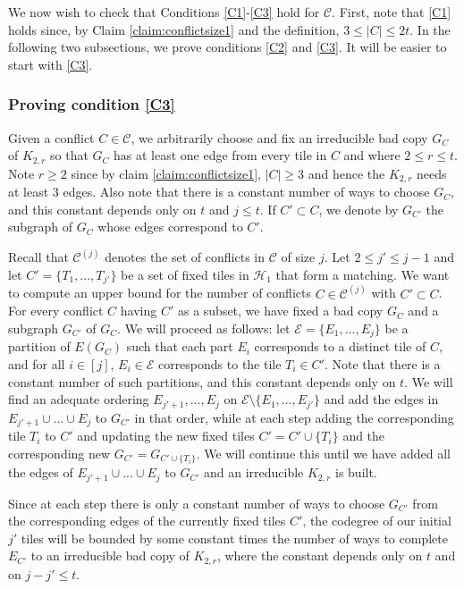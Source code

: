 \documentclass{article}
\theoremstyle{definition}
\newcommand\cH{{\mathcal H}}
\newcommand\cC{{\mathcal C}}
\begin{document}
We now wish to check that Conditions \ref{C1}-\ref{C3} hold for $\cC$.  First, note that \ref{C1} holds since, by Claim \ref{claim:conflictsize1} and the definition, $3 \leq |C| \leq 2t$. 
In the following two subsections, we prove conditions \ref{C2} and \ref{C3}. It will be easier to start with \ref{C3}. 




\subsubsection{Proving condition \ref{C3}}

 
Given a conflict $C\in \mathcal{C}$, we arbitrarily choose and fix an irreducible bad copy $G_C$ of $K_{2,r}$ so that $G_C$ has at least one edge from every tile in $C$ and where $2\leq r\leq t$. Note $r\geq 2$ since by claim \cref{claim:conflictsize1}, $|C|\geq 3$ and hence the $K_{2,r}$ needs at least $3$ edges. Also note that there is a constant number of ways to choose $G_C$, and this constant depends only on $t$ and $j\le t$.
If $C' \subset C$, we denote by $G_{C'}$ the subgraph of $G_C$ whose edges correspond to $C'$.



Recall that $\mathcal{C}^{(j)}$ denotes the set of conflicts in $\mathcal{C}$ of size $j$.
Let $2\leq j'\leq j-1$ and let $C'=\{T_1,...,T_{j'}\}$ be a set of fixed tiles in $\cH_1$ that form a matching. We want to compute an upper bound for the number of conflicts $C\in \mathcal{C}^{(j)}$ with $C'\subset C$.  For every conflict $C$ having $C'$ as a subset, we have fixed a bad copy $G_C$ and a subgraph $G_{C'}$ of $G_C$.  
We will proceed as follows:  let $\mathcal{E}=\{E_1, \dots, E_j\}$ be a partition of $E(G_{C})$ such that each part $E_i$ corresponds to a  distinct tile of $C$, and for all $i\in [j]$, $E_i\in \mathcal{E}$ corresponds to the tile $T_i \in C'$. Note that there is a constant number of such partitions, and this constant depends only on $t$.  We will find an adequate ordering $E_{j'+1},...,E_{j}$ on $\mathcal{E}\setminus \{E_1,...,E_{j'}\}$ and add the edges in $E_{j'+1}\cup ...\cup E_{j}$ to $G_{C'}$ in that order, while at each step adding the corresponding tile $T_i$ to $C'$  and updating the new fixed tiles $C'=C'\cup \{T_i\}$ and the corresponding new $G_{C'}= G_{C'\cup \{T_i\}}$. We will continue this until we have added all the edges of $E_{j'+1}\cup ...\cup E_{j}$ to $G_{C'}$ and an irreducible $K_{2,r}$ is built. 

Since at each step there is only a constant number of ways to choose $G_{C'}$ from the corresponding edges of the currently fixed tiles $C'$, the codegree of our initial $j'$ tiles will be bounded by some constant times the number of ways to complete $E_{C'}$  to an irreducible bad copy of $K_{2,r}$, where the constant depends only on $t$ and on $j-j' \le t$.
\end{document}
